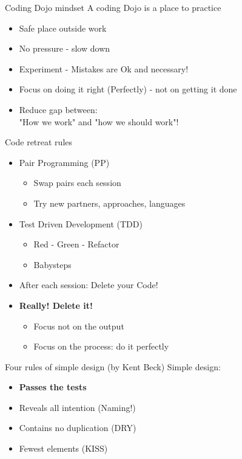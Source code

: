 \documentclass[12pt, xcolor=table, dvipsnames]{beamer}
\newcommand{\red}[1]{{\color{red}#1}}
\begin{document}
\begin{frame}{Coding Dojo mindset}
A coding Dojo is a place to practice
\pause

	\begin{itemize}[<+->]
		\item Safe place outside work
		\item No pressure - slow down
		\item Experiment - Mistakes are Ok and necessary!
		\item Focus on doing it right (Perfectly) - not on getting it done
		\item Reduce gap between: \\"How we work" and "how we should work"!%
	\end{itemize}  
\end{frame}


\begin{frame}{Code retreat rules}
\pause
	\begin{itemize}[<+->]
		\item Pair Programming (PP)
		\begin{itemize}[<+->]
			\item Swap pairs each session
		    \item Try new partners, approaches, languages
		\end{itemize}		
		\item Test Driven Development (TDD)
		\begin{itemize}[<+->]
			\item Red - Green - Refactor
		    \item Babysteps
		\end{itemize}		
		\item After each session: Delete your Code!
		\item \textbf{\red{Really! Delete it!}}
		\begin{itemize}[<+->]
			\item Focus not on the output
		    \item Focus on the process: do it perfectly
		\end{itemize}		
		
	\end{itemize}
\end{frame}

\begin{frame}{Four rules of simple design (by Kent Beck)}
	Simple design:\pause
	\begin{itemize}[<+->]
		\item \textbf{\color{red} Passes the tests}
		\item Reveals all intention (Naming!)
		\item Contains no duplication (DRY)
		\item Fewest elements (KISS)
	\end{itemize}
\end{frame}
\end{document}
